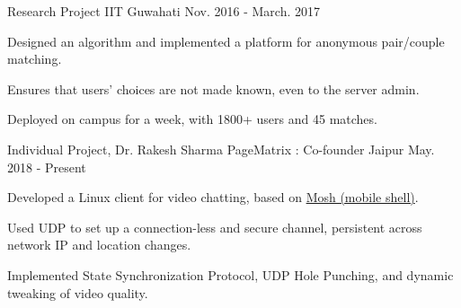 \begin{cventries}
  \cventry
  {Research Project}
  {\href{https://github.com/pclubiitk/puppy-love}{}}
  {IIT Guwahati}
  {Nov. 2016 - March. 2017}
  {
    \begin{cvitems}
      \item Designed an algorithm and implemented a platform
        for anonymous pair/couple matching.
      \item Ensures that users' choices are not made known, even to the
        server admin.
      \item Deployed on campus for a week, with 1800+ users and 45 matches.
    \end{cvitems}
  }
   

  \cventry
  {Individual Project, Dr. Rakesh Sharma}
  {PageMatrix : Co-founder}
  {Jaipur}
  {May. 2018 - Present}
  {
    \begin{cvitems}
    \item Developed a Linux client for video chatting,
      based on \href{https://mosh.org/}{Mosh (mobile shell)}.
    \item Used UDP to set up a connection-less and secure channel,
      persistent across network IP and location changes.
    \item Implemented State Synchronization Protocol, UDP Hole
      Punching, and dynamic tweaking of video quality.
    \end{cvitems}
  }
  


\end{cventries}

